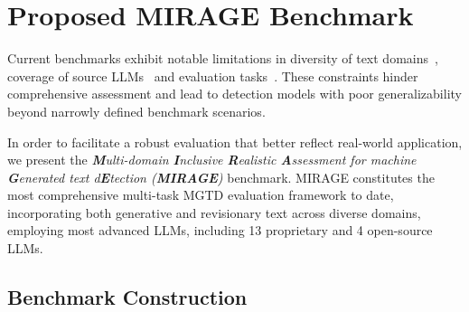 \section{Proposed MIRAGE Benchmark}


Current benchmarks exhibit notable limitations in diversity of text domains~\cite{turingbench, detectrl}, coverage of source LLMs~\cite{m4bench, raid} and evaluation tasks~\cite{mage, hc3}.
%
These constraints hinder comprehensive assessment and lead to detection models with poor generalizability beyond narrowly defined benchmark scenarios.

In order to facilitate a robust evaluation that better reflect real-world application, we present the \textit{\textbf{M}ulti-domain \textbf{I}nclusive \textbf{R}ealistic \textbf{A}ssessment for machine \textbf{G}enerated text d\textbf{E}tection (\textbf{MIRAGE})} benchmark.
%
MIRAGE constitutes the most comprehensive multi-task MGTD evaluation framework to date, incorporating both generative and revisionary text across diverse domains, employing most advanced LLMs, including 13 proprietary and 4 open-source LLMs.


\subsection{Benchmark Construction}
 
